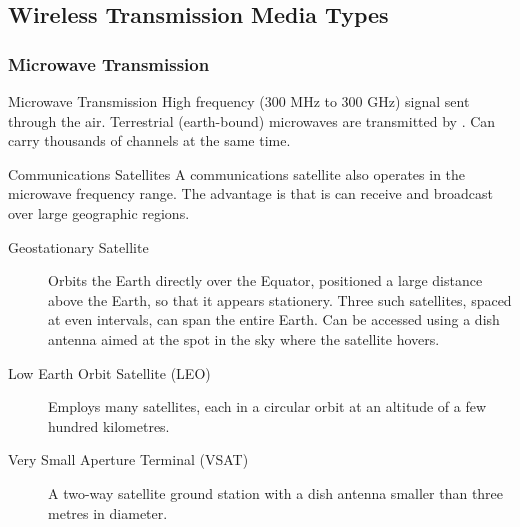 \documentclass[\main/notes.tex]{subfiles}
\begin{document}
			\subsection{Wireless Transmission Media Types}
				\subsubsection{Microwave Transmission}
					\begin{definition}{Microwave Transmission}
						High frequency (300 MHz to 300 GHz) signal sent through the air. Terrestrial (earth-bound) microwaves are transmitted by . Can carry thousands of channels at the same time.
					\end{definition}
					\begin{sidenote}{Communications Satellites}
						A communications satellite also operates in the microwave frequency range. The advantage is that is can receive and broadcast over large geographic regions.
						\begin{description}
							\item[Geostationary Satellite] Orbits the Earth directly over the Equator, positioned a large distance above the Earth, so that it appears stationery. Three such satellites, spaced at even intervals, can span the entire Earth. Can be accessed using a dish antenna aimed at the spot in the sky where the satellite hovers.
							\item[Low Earth Orbit Satellite (LEO)] Employs many satellites, each in a circular orbit at an altitude of a few hundred kilometres.
							\item[Very Small Aperture Terminal (VSAT)] A two-way satellite ground station with a dish antenna smaller than three metres in diameter.
						\end{description}
					\end{sidenote}
\end{document}

